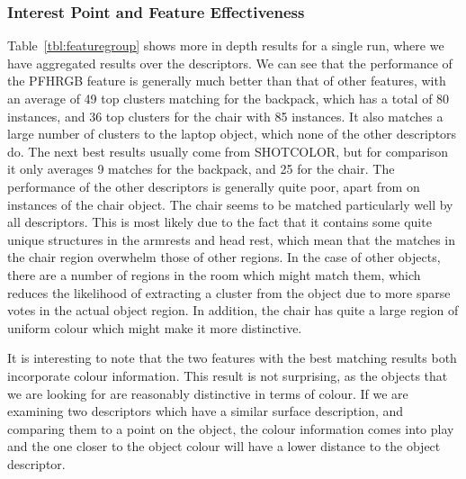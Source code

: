 \documentclass[11pt,a4paper]{kth-mag}
\begin{document}
\subsubsection{Interest Point and Feature Effectiveness}
Table~\ref{tbl:featuregroup} shows more in depth results for a single run, where
we have aggregated results over the descriptors. We can see that the performance
of the PFHRGB feature is generally much better than that of other features, with
an average of 49 top clusters matching for the backpack, which has a total of 80
instances, and 36 top clusters for the chair with 85 instances. It also matches
a large number of clusters to the laptop object, which none of the other
descriptors do. The next best results usually come from SHOTCOLOR, but for
comparison it only averages 9 matches for the backpack, and 25 for the chair.
The performance of the other descriptors is generally quite poor, apart from on
instances of the chair object. The chair seems to be matched particularly well
by all descriptors. This is most likely due to the fact that it contains some
quite unique structures in the armrests and head rest, which mean that the
matches in the chair region overwhelm those of other regions. In the case of
other objects, there are a number of regions in the room which might match them,
which reduces the likelihood of extracting a cluster from the object due to more
sparse votes in the actual object region. In addition, the chair has quite a
large region of uniform colour which might make it more distinctive.

It is interesting to note that the two features with the best matching results
both incorporate colour information. This result is not surprising, as the
objects that we are looking for are reasonably distinctive in terms of colour.
If we are examining two descriptors which have a similar surface description,
and comparing them to a point on the object, the colour information comes into
play and the one closer to the object colour will have a lower distance to the
object descriptor.
\end{document}
